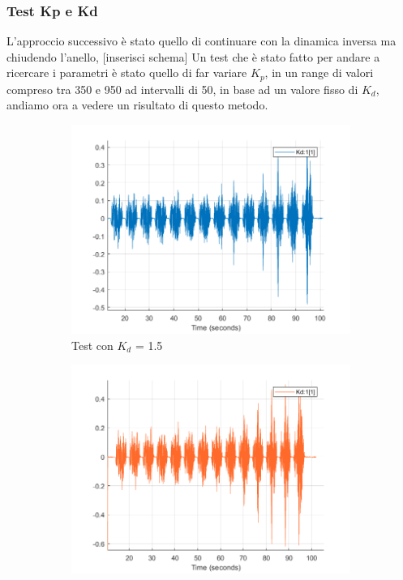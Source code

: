 \subsubsection*{Test Kp e Kd}
L'approccio successivo è stato quello di continuare con la dinamica inversa ma chiudendo l'anello, [inserisci schema]
Un test che è stato fatto per andare a ricercare i parametri è stato quello di far variare $K_p$, in un range di valori compreso tra 350 e 950 ad intervalli di 50, in base ad un valore fisso di $K_d$, andiamo ora a vedere un risultato di questo metodo.
\begin{figure}[!ht]
\begin{subfigure}{.5\textwidth}
  \centering
  \includegraphics[width=.8\linewidth]{Immagini/Sperimentale/Test_Kd=15.png}  
  \caption{Test con $K_d$ = 1.5}
  \label{fig:sub-kd1.5}
\end{subfigure}
\begin{subfigure}{.5\textwidth}
  \centering
  \includegraphics[width=.8\linewidth]{Immagini/Sperimentale/Test_Kd=2.png}  

\end{subfigure}
\end{figure}
